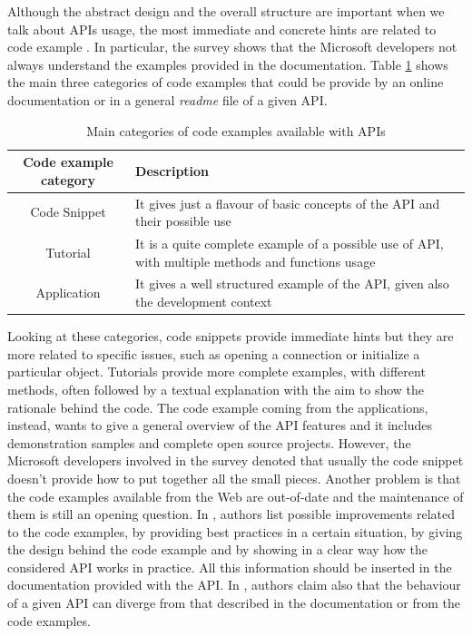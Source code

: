 Although the abstract design and the overall structure are important when we 
talk about APIs usage, the most immediate and concrete hints are related to 
code example \cite{martin_p._robillard_what_2009}. In particular, the survey 
shows that the Microsoft developers not always understand the examples provided 
in the documentation. Table \ref{tab:ApiCodeExampleCategories} shows the main 
three categories of code examples that could be provide by an online 
documentation or in a general \textit{readme} file of a given API. 

\begin{table}[!t]
  \small
		\begin{tabular}{|c|p{9.5cm}|}
			\hline
			 \textbf{Code example category } & \textbf{Description} \\
			\hline
			 Code Snippet & It gives just a flavour of basic concepts of the 
			 API and their possible use\\
			\hline
			Tutorial & It is a quite complete example of a possible use of API, 
			with multiple methods and functions usage\\
			\hline
			Application & It gives a well structured example of the API, given 
			also the development context \\
			\hline
		\end{tabular}
  	\caption{Main categories of code examples available with APIs}
	\label{tab:ApiCodeExampleCategories}
\end{table} 

Looking at these categories, code snippets provide immediate hints but they are 
more related to specific issues, such as opening a connection or initialize a 
particular object. Tutorials provide more complete examples, with different 
methods, often followed by a textual explanation with the aim to show the 
rationale behind the code. The code example coming from the applications, 
instead, wants to give a general overview of the API features and it includes 
demonstration samples and complete open source projects. However, the Microsoft 
developers involved in the survey denoted that usually the code snippet doesn't 
provide how to put together all the small pieces. Another problem is that the 
code examples available from the Web are out-of-date and the maintenance of 
them is still an opening question. In \cite{martin_p._robillard_what_2009}, 
authors list possible improvements related to the code examples, by providing 
best practices in a certain situation, by giving the design behind the code 
example and by showing in a clear way how the considered API works in practice. 
All this information should be inserted in the documentation provided with the 
API. In  \cite{martin_p._robillard_what_2009}, authors claim also that the 
behaviour of a given API can diverge from that described in the documentation 
or from the code examples. 

